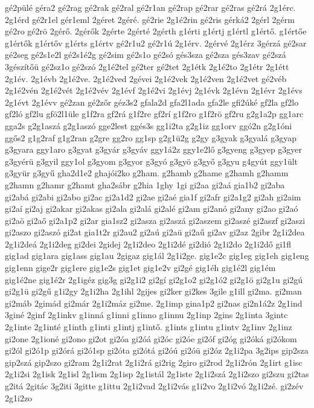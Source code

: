{gé2pülé
géra2
gé2rag
gé2rak
gé2ral
gé2r1an
gé2rap
gé2rar
gé2ras
gé2rá
2g1érc.
2g1érd
gé2r1el
gér1eml
2géret
2géré.
gé2rie
2g1é2rin
gé2ris
gérká2
2gérl
2gérm
gé2ro
gé2rö
2gérő.
2gérők
2gérte
2gérté
2gérth
g1érti
g1értj
g1értl
g1értő.
g1értőe
g1értők
g1értőv
g1érts
g1értv
gé2r1u2
gé2r1ú
2g1érv.
2gérvé
2g1érz
3gérzá
gé2sar
gé2seg
gé2s1e2l
gé2s1é2g
gé2sim
gé2s1o
gé2só
gés3sza
gé2sza
gés3zav
gé2szá
3gészítőü
gé2sz1o
gé2szó
2g1é2tel
gé2ter
gé2tet
2g1étk
2g1é2to
2g1étr
2g1étt
2g1év.
2g1évb
2g1é2ve.
2g1é2ved
2gévei
2g1é2vek
2g1é2ven
2g1é2vet
gé2véb
2g1é2vén
2g1é2vét
2g1é2vév
2g1évf
2g1é2vi
2g1évj
2g1évk
2g1évn
2g1évr
2g1évs
2g1évt
2g1évv
gé2zan
gé2zőr
géz3s2
gfala2d
gfa2l1ada
gfa2le
gfi2úké
gf2la
gf2lo
gf2ló
gf2lu
gfö2l1üle
g1f2ra
gf2rá
g1f2re
gf2rí
g1f2ro
g1f2rö
gf2ru
g2g1a2p
gg1arc
gga2s
g2g1aszá
g2g1aszó
gge2lest
ggés3s
gg1i2ta
g2g1iz
gg1orv
ggó2n
g2g1óni
ggős2
g1g2raf
g1g2ran
g2gre
gg2ro
gg1sp
g2g1ü2g
g2gy
g3gyak
g3gyalá
g3gyap
g3gyara
ggy1aro
g3gyat
g3gyár
g3gyáv
ggy1á2z
ggy1e2lő
g3gyeng
g3gyep
g3gyer
g3gyérü
g3gyil
ggy1ol
g3gyom
g3gyor
g3gyó
g3gyö
g3győ
g3gyu
g4gyút
ggy1ült
g3gyür
g3gyű
gha2d1e2
ghajói2ko
g2ham.
g2hamb
g2hame
g2hamh
g2hamm
g2hamn
g2hamr
g2hamt
gha2sábr
g2hia
1ghy
1gi
gi2aa
gi2aá
gia1b2
gi2aba
gi2abá
gi2abi
gi2abo
gi2ac
gi2a1d2
gi2ae
gi2aé
gia1f
gi2afr
gi2a1g2
gi2ah
gi2aim
gi2aí
gi2aj
gi2akar
gi2akas
gi2ala
gi2alá
gi2alé
gi2am
gi2anó
gi2any
gi2ao
gi2aó
gi2aö
gi2aő
gi2a1p2
gi2ar
gia1sz2
gi2asza
gi2aszá
gi2aszem
gi2aszé
gi2aszf
gi2aszi
gi2aszo
gi2aszó
gi2at
gia1t2r
gi2au2
gi2aú
gi2aü
gi2aű
gi2av
gi2az
2gibr
2g1i2dea
2g1i2deá
2g1i2deg
gi2dei
2gidej
2g1i2deo
2g1i2dé
gi2dió
2g1i2do
2g1i2dő
gi1fl
gig1ad
gig1ara
gig1ass
gig1au
2gigaz
gig1ál
2g1i2ge.
gig1e2c
gig1eg
gig1eh
gig1eng
gig1enn
gige2r
gig1ere
gig1e2s
gig1et
gig1e2v
gi2gé
gig1éh
gig1é2l
gig1ém
gig1é2ne
gig1é2r
2g1igéz
gig3g
gi2g1i2
gi2gí
gi2g1o2
gi2g1ó2
gi2g1ö
gi2g1u
gi2gú
gi2g1ü
gi2gű
g1i2gy
2g1i2ha
2g1ihl
2gijes
gi2ker
gi2kes
3gile
g1ill
gi2ma.
gi2man
gi2máb
2gimád
gi2már
2g1i2máz
gi2me.
2g1imp
gina1p2
gi2nas
gi2n1á2z
2g1ind
3giné
2ginf
2g1inkv
g1inná
g1inni
g1inno
g1innu
2g1inp
2gins
2g1inta
3gintc
2g1inte
2g1inté
g1inth
g1inti
g1intj
g1intő.
g1ints
g1intu
g1intv
2g1inv
2g1inz
gi2one
2g1ioné
gi2ono
gi2ot
gi2óa
gi2óá
gi2óc
gi2óe
gi2óf
gi2óg
gi2óká
gi2ókom
gi2ól
gi2ó1p
gi2órá
gi2ó1sp
gi2óta
gi2ótá
gi2óú
gi2óü
gi2óz
2g1i2pa
3g2ips
gip2sza
gip2szá
gip2szo
gi2ram
2g1i2rat
2g1i2rá
gi2rig
2giro
gi2rod
2g1i2rón
2g1irt
g1isc
2g1i2si
2g1isk
2g1isl
2g1ism
2g1isp
2g1istál
2g1iste
2g1i2szá
2g1i2szo
gi2szu
gi2tas
g2itá
2gitác
3g2iti
3gitte
g1ittu
2g1i2vad
2g1i2vás
g1i2vo
2g1i2vó
2g1i2zé.
gi2zév
2g1i2zo
}
